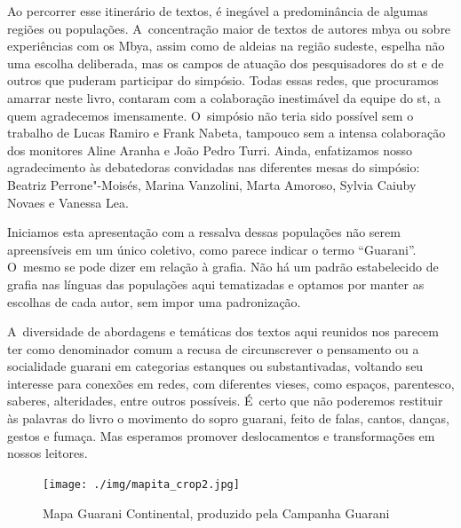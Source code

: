 Ao percorrer esse itinerário de textos, é inegável a predominância de
algumas regiões ou populações. A~concentração maior de textos de
autores mbya ou sobre experiências com os Mbya, assim como de aldeias
na região sudeste, espelha não uma escolha deliberada, mas os campos de
atuação dos pesquisadores do st e de outros que puderam participar
do simpósio. Todas essas redes, que procuramos amarrar neste livro,
contaram com a colaboração inestimável da equipe do st, a quem
agradecemos imensamente. O~simpósio não teria sido possível sem o
trabalho de Lucas Ramiro e Frank Nabeta, tampouco sem a intensa
colaboração dos monitores Aline Aranha e João Pedro Turri. Ainda, enfatizamos nosso
agradecimento às debatedoras convidadas nas diferentes mesas do
simpósio: Beatriz Perrone"-Moisés, Marina Vanzolini, Marta Amoroso,
Sylvia Caiuby Novaes e Vanessa Lea.

Iniciamos esta apresentação com a ressalva dessas populações não serem
apreensíveis em um único coletivo, como parece indicar o termo ``Guarani''.
O~mesmo se pode dizer em relação à grafia. Não há um padrão
estabelecido de grafia nas línguas das populações aqui tematizadas e
optamos por manter as escolhas de cada autor, sem impor uma
padronização. 

\begin{samepage}
A~diversidade de abordagens e temáticas dos textos aqui reunidos nos
parecem ter como denominador comum a recusa de circunscrever o
pensamento ou a socialidade guarani em categorias estanques ou
substantivadas, voltando seu interesse para conexões em redes, com
diferentes vieses, como espaços, parentesco, saberes, alteridades,
entre outros possíveis. É~certo que não poderemos restituir às palavras
do livro o movimento do sopro guarani, feito de falas, cantos, danças,
gestos e fumaça. Mas esperamos promover deslocamentos e transformações
em nossos leitores. 
\end{samepage}

\pagebreak

\begin{absolutelynopagebreak}
\begin{vplace}
\begin{figure}[H]
\begin{adjustwidth}{-2.4cm}{}
  \vspace{-3.1cm}
  \texttt{[image: ./img/mapita\_crop2.jpg]}	
\end{adjustwidth}
  \caption{Mapa Guarani Continental, produzido pela Campanha Guarani}
\end{figure}
\end{vplace}

\thispagestyle{empty}
\end{absolutelynopagebreak}

